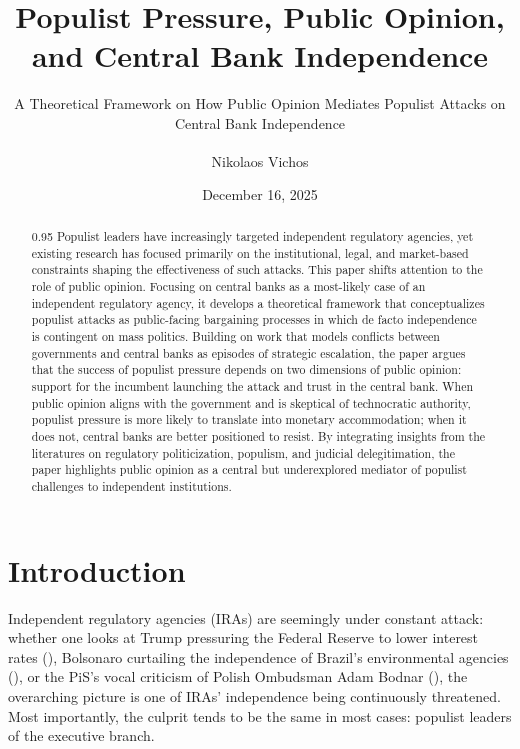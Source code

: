 \documentclass[
  11pt,
  letterpaper,
  DIV=11,
  numbers=noendperiod]{scrartcl}
\title{Populist Pressure, Public Opinion, and Central Bank Independence}
\subtitle{A Theoretical Framework on How Public Opinion Mediates
Populist Attacks on Central Bank Independence}
\author{Nikolaos Vichos\textsuperscript{}}
\date{December 16, 2025}
\begin{document}
\maketitle
\begin{abstract}
\begin{spacing}{0.95}
Populist leaders have increasingly targeted independent regulatory agencies, yet existing research has focused primarily on the institutional, legal, and market-based constraints shaping the effectiveness of such attacks. This paper shifts attention to the role of public opinion. Focusing on central banks as a most-likely case of an independent regulatory agency, it develops a theoretical framework that conceptualizes populist attacks as public-facing bargaining processes in which de facto independence is contingent on mass politics. Building on work that models conflicts between governments and central banks as episodes of strategic escalation, the paper argues that the success of populist pressure depends on two dimensions of public opinion: support for the incumbent launching the attack and trust in the central bank. When public opinion aligns with the government and is skeptical of technocratic authority, populist pressure is more likely to translate into monetary accommodation; when it does not, central banks are better positioned to resist. By integrating insights from the literatures on regulatory politicization, populism, and judicial delegitimation, the paper highlights public opinion as a central but underexplored mediator of populist challenges to independent institutions.
\end{spacing}
\end{abstract}



\newpage{}

\thispagestyle{empty}

\tableofcontents

\newpage{}


\section{\texorpdfstring{\textbf{Introduction}}{Introduction}}\label{introduction}

Independent regulatory agencies (IRAs) are seemingly under constant
attack: whether one looks at Trump pressuring the Federal Reserve to
lower interest rates (), Bolsonaro curtailing the independence of Brazil's
environmental agencies (), or the PiS's vocal criticism of Polish Ombudsman Adam Bodnar
(), the overarching picture is one
of IRAs' independence being continuously threatened. Most importantly,
the culprit tends to be the same in most cases: populist leaders of the
executive branch.
\end{document}
